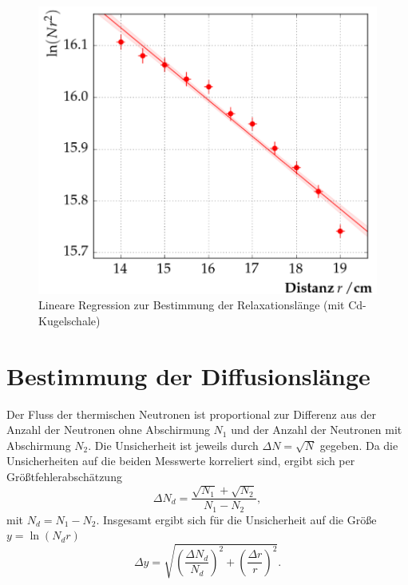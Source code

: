 \begin{figure}[tb]
  \centering
  \includegraphics[scale=0.5]{./fig/plot2.png}
  \caption{Lineare Regression zur Bestimmung der Relaxationslänge (mit Cd-Kugelschale)}
  \label{fig:plot2}
\end{figure}

\section{Bestimmung der Diffusionslänge}

Der Fluss der thermischen Neutronen ist proportional zur Differenz aus der Anzahl der Neutronen ohne Abschirmung $N_{1}$ und der Anzahl der Neutronen mit Abschirmung $N_{2}$. Die Unsicherheit ist jeweils durch $\Delta N=\sqrt{N}$ gegeben.
Da die Unsicherheiten auf die beiden Messwerte korreliert sind, ergibt sich per Größtfehlerabschätzung
\begin{equation}
 \Delta N_{d} = \frac{\sqrt{N_{1}}+\sqrt{N_{2}}}{N_{1}-N_{2}},
\end{equation}
mit $N_{d}=N_{1}-N_{2}$.
Insgesamt ergibt sich für die Unsicherheit auf die Größe $y=\ln(N_{d}r)$
\begin{equation}
 \Delta y = \sqrt{\left(\frac{\Delta N_{d}}{N_{d}}\right)^{2}+\left(\frac{\Delta r}{r}\right)^{2}}.
\end{equation}


